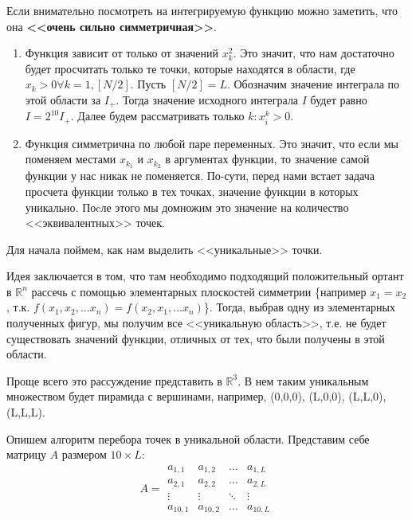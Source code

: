 \documentclass[oneside, final, 12pt]{article}
\begin{document}
	Если внимательно посмотреть на интегрируемую функцию можно заметить, что она 
	\textbf{<<очень сильно симметричная>>}.
	\begin{enumerate}
		\item Функция зависит от только от значений $x_k^2$. 
					\newline Это значит, что нам достаточно будет просчитать только те
						точки, которые находятся в области, где $x_k>0 \forall k=1, [N/2]$. Пусть $[N/2] = L$.
						Обозначим значение интеграла по этой области за $I_{+}$. 
						Тогда значение исходного интеграла $I$ будет равно $I= 2^{10}I_+$. \newline
						Далее будем рассматривать только  $k: x_i^k >0$.
		\item Функция симметрична по любой паре переменных. \newline
				Это значит, что если мы поменяем местами $x_{k_1}$ и  $x_{k_2}$ в аргументах функции, 
				то значение самой функции у нас никак не поменяется. По-сути, перед нами встает 
				задача просчета функции только в тех точках, значение функции 
				в которых уникально. Поcле этого мы домножим это значение 
				на количество <<эквивалентных>> точек.
	\end{enumerate}

	Для начала поймем, как нам выделить <<уникальные>> точки.

	Идея заключается в том, что там необходимо подходящий положительный ортант в $\mathbb{R}^n$ рассечь 
	с помощью элементарных плоскостей симметрии \{например $x_1 = x_2$,
	т.к. $f(x_1,x_2,\ldots x_n) =  f(x_2,x_1,\ldots x_n)$\}. Тогда, выбрав одну из элементарных полученных фигур, 
	мы получим все <<уникальную область>>, т.е. не будет существовать значений функции, отличных от тех, 
	что были получены в этой области. 

	Проще всего это рассуждение представить в $\mathbb{R}^3$. В нем таким 
	уникальным множеством будет пирамида с вершинами, например, (0,0,0), (L,0,0), (L,L,0), (L,L,L).
	
	\newpage
	Опишем алгоритм перебора точек в уникальной области.\newline
	Представим себе матрицу $A$ размером $10\times L:$
	\begin{equation*}
			A = 
			\begin{array}{cccc}
			a_{1,1} & a_{1,2} & \ldots & a_{1,L}\\
			a_{2,1}  & a_{2,2} & \ldots & a_{2,L}\\
			\vdots  & \vdots & \ddots & \vdots\\
			a_{10, 1} & a_{10, 2} & \ldots & a_{10, L}
			\end{array}
	\end{equation*}
	
\end{document}
